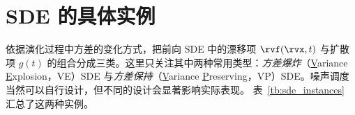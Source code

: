 \section{SDE 的具体实例}\label{sec:instances}

\citet{song2020score} 依据演化过程中方差的变化方式，把前向 SDE 中的漂移项 $\rvf(\rvx, t)$ 与扩散项 $g(t)$ 的组合分成三类。这里只关注其中两种常用类型：\emph{方差爆炸}（\underline{V}ariance \underline{E}xplosion，VE）SDE 与\emph{方差保持}（\underline{V}ariance \underline{P}reserving，VP）SDE。噪声调度当然可以自行设计，但不同的设计会显著影响实际表现。
表~\ref{tb:sde_instances} 汇总了这两种实例。
\begin{table}[th]
  \caption{前向 SDE 汇总}
  \small
  \centering
  \label{tb:sde_instances}
\end{table}


